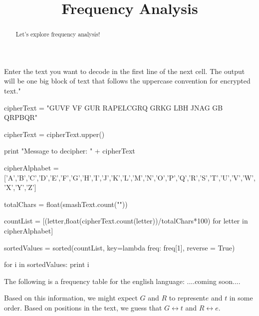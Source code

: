 \documentclass[handout]{ximera}
\title{Frequency Analysis}
\begin{document}
\begin{abstract}{Let's explore frequency analysis!}\end{abstract}


Enter the text you want to decode in the first line of the next cell.  The output will be one big block of text that follows the uppercase convention for encrypted text."

\begin{python}
cipherText = "GUVF VF GUR RAPELCGRQ GRKG LBH JNAG GB QRPBQR"

cipherText = cipherText.upper()

print "Message to decipher: " + cipherText

cipherAlphabet = ['A','B','C','D','E','F','G','H','I','J','K','L','M','N','O','P','Q','R','S','T','U','V','W','X','Y','Z']

totalChars = float(smashText.count(""))

countList = [(letter,float(cipherText.count(letter))/totalChars*100) for letter in cipherAlphabet]

sortedValues = sorted(countList, key=lambda freq: freq[1], reverse = True)

for i in sortedValues:
	print i
\end{python}

The following is a frequency table for the english language: ....coming soon....


Based on this information, we might expect $G$ and $R$ to represent$ e$ and $t$ in some order.  Based on positions in the text, we guess that $G \leftrightarrow t$ and $R \leftrightarrow e$.
\end{document}
